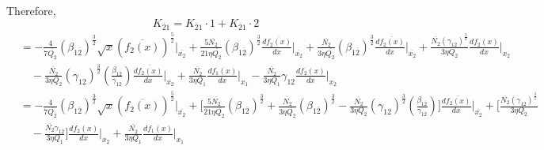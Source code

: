 \documentclass[fleqn, 10pt]{article}
\begin{document}
                Therefore,
                \begin{equation*}
                    K_{\overline{2}1} = K_{\overline{2}1} \cdot 1 + K_{\overline{2}1} \cdot 2 
                \end{equation*}
                \begin{equation*}
                \begin{split}
                    &= -   \frac{4}{7\overline{Q_2}} (\beta_{1\overline{2}})^\frac{3}{2} \sqrt{x} (\overline{f_2(x)})^\frac{5}{2} \Bigg|_{\overline{x_2}} +  \frac{5 \overline{N_2}}{21 \eta \overline{Q_2}} (\beta_{1\overline{2}})^\frac{3}{2} \frac{d\overline{f_2(x)}}{dx} \Bigg|_{\overline{x_2}}
                    +   \frac{\overline{N_2}}{3 \eta \overline{Q_2}} (\beta_{1\overline{2}})^\frac{3}{2} \frac{d\overline{f_2(x)}}{dx}\Bigg|_{\overline{x_2}} +  \frac{\overline{N_2}(\gamma_{12})^\frac{3}{2}}{3 \eta Q_2} \frac{df_2(x)}{dx} \Bigg|_{x_2} \\ & \quad -   \frac{\overline{N_2}}{3 \eta Q_{2}} (\gamma_{12})^\frac{3}{2} \left(\frac{\beta_{1\overline{2}}}{\gamma_{12}}\right) \frac{d\overline{f_2(x)}}{dx} \Bigg|_{\overline{x_2}} +   \frac{\overline{N_2}}{3 \eta Q_1} \frac{df_1(x)}{dx} \Bigg|_{x_1} -   \frac{\overline{N_2}}{3 \eta Q_1} \gamma_{12} \frac{df_2(x)}{dx} \Bigg|_{x_2}
                    \end{split}
                    \end{equation*}
                    \begin{equation*}
                    \begin{split}
                        &= -   \frac{4}{7\overline{Q_2}} (\beta_{1\overline{2}})^\frac{3}{2} \sqrt{x} (\overline{f_2(x)})^\frac{5}{2} \Bigg|_{\overline{x_2}} + \Biggl[ \frac{5 \overline{N_2}}{21 \eta \overline{Q_2}} (\beta_{1\overline{2}})^\frac{3}{2} + \frac{\overline{N_2}}{3 \eta \overline{Q_2}} (\beta_{1\overline{2}})^\frac{3}{2} -   \frac{\overline{N_2}}{3 \eta Q_{2}} (\gamma_{12})^\frac{3}{2} \left(\frac{\beta_{1\overline{2}}}{\gamma_{12}}\right) \Biggr] \frac{d\overline{f_2(x)}}{dx}\Bigg|_{\overline{x_2}} + \Biggl[ \frac{\overline{N_2}(\gamma_{12})^\frac{3}{2}}{3 \eta Q_2} \\ & \quad -   \frac{\overline{N_2} \gamma_{12}}{3 \eta Q_1} \Biggr] \frac{df_2(x)}{dx} \Bigg|_{x_2} +   \frac{\overline{N_2}}{3 \eta Q_1} \frac{df_1(x)}{dx} \Bigg|_{x_1}
                        \end{split}
                    \end{equation*}
\end{document}
